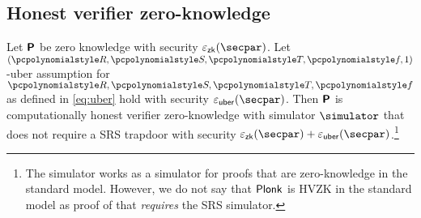 \subsection{Honest verifier zero-knowledge}
\begin{lemma}
  \label{lem:plonk_hvzk}
  Let $\bm{\mathsf{P}}$ be zero knowledge with security $\epszk(\secpar)$. Let
  $(\pR, \pS, \pT, \pf, 1)$-uber assumption for $\pR, \pS, \pT, \pf$ as defined
  in \cref{eq:uber} hold with security $\epsuber(\secpar)$. Then $\bm{\mathsf{P}}$ is
  computationally honest verifier zero-knowledge with simulator $\simulator$
  that does not require a SRS trapdoor with security
  $\epszk(\secpar) + \epsuber(\secpar)$.\footnote{The simulator works as a simulator for proofs
    that are zero-knowledge in the standard model. However, we do not say that
    $\textnormal{\textsf{Plonk}}$ is HVZK in the standard model as proof of that \emph{requires} the
    SRS simulator.}
\end{lemma}

